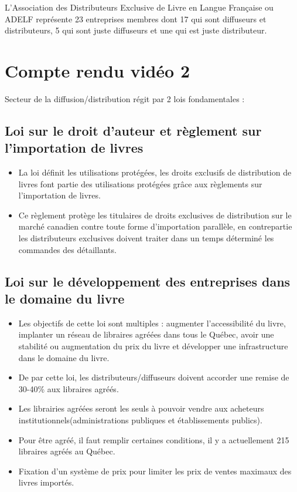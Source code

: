 \documentclass[a4paper, 13pt]{article}
\begin{document}
L'Association des Distributeurs Exclusive de Livre en Langue Française ou ADELF représente 23 entreprises membres dont 17 qui sont diffuseurs et distributeurs, 5 qui sont juste diffuseurs et une qui est juste distributeur.

\section{Compte rendu vidéo 2}
Secteur de la diffusion/distribution régit par 2 lois fondamentales :
\subsection{Loi sur le droit d’auteur et règlement sur l’importation de livres}
\begin{itemize}
    \item La loi définit les utilisations protégées, les droits exclusifs de distribution de livres font partie des utilisations protégées grâce aux règlements sur l’importation de livres.
    \item Ce règlement protège les titulaires de droits exclusives de distribution sur le marché canadien contre toute forme d’importation parallèle, en contrepartie les distributeurs exclusives doivent traiter dans un temps déterminé les commandes des détaillants.
\end{itemize}
\subsection{Loi sur le développement des entreprises dans le domaine du livre}
\begin{itemize}
    \item Les objectifs de cette loi sont multiples : augmenter l’accessibilité du livre, implanter un réseau de libraires agréées dans tous le Québec, avoir une stabilité ou augmentation du prix du livre et développer une infrastructure dans le domaine du livre. 
    \item De par cette loi, les distributeurs/diffuseurs doivent accorder une remise de 30-40\% aux libraires agréés. 
    \item Les librairies agréées seront les seuls à pouvoir vendre aux acheteurs institutionnels(administrations publiques et établissements publics).
    \item Pour être agréé, il faut remplir certaines conditions, il y a actuellement 215 libraires agréés au Québec.
    \item Fixation d’un système de prix pour limiter les prix de ventes maximaux des livres importés.
\end{itemize}
\end{document}
